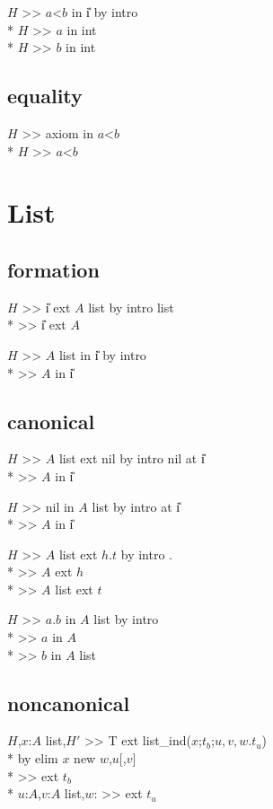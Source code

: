 \goalskip

\goal $H$ >> $a$<$b$ in \U{i} by intro \\*
\subgoal $H$ >> $a$ in int \\*
\subgoal $H$ >> $b$ in int

\subsection*{equality}
\goal $H$ >> axiom in $a$<$b$ \\*
\subgoal $H$ >> $a$<$b$
\par

\section{List}
\subsection*{formation}
\goal $H$ >> \U{i} ext $A$ list by intro list \\*
\subgoal >> \U{i} ext $A$


\goalskip

\goal $H$ >> $A$ list in \U{i} by intro \\*
\subgoal >> $A$ in \U{i}

\subsection*{canonical}
\goal $H$ >> $A$ list ext nil by intro nil at \U{i} \\*
\subgoal  >> $A$ in \U{i}


\goalskip

\goal $H$ >> nil in $A$ list by intro at \U{i} \\*
\subgoal  >> $A$ in \U{i}

\goalskip

\goal $H$ >> $A$ list ext $h$.$t$ by intro . \\*
\subgoal >> $A$ ext $h$\\*
\subgoal >> $A$ list ext $t$


\goalskip

\goal $H$ >> $a.b$ in $A$ list by intro \\*
\subgoal >> $a$ in $A$ \\*
\subgoal >> $b$ in $A$ list

\subsection*{noncanonical}
\goal $H$,$x$:$A$ list,$H'$ >> T 
           ext list\_ind($x$;$t_b$;$u,v,w$.$t_u$) \\*
\continuegoal by elim $x$ new $w$,$u$[,$v$] \\*
\subgoal >>  ext $t_b$\\*
\subgoal $u$:$A$,$v$:$A$ list,$w$:
          >>   ext $t_u$


